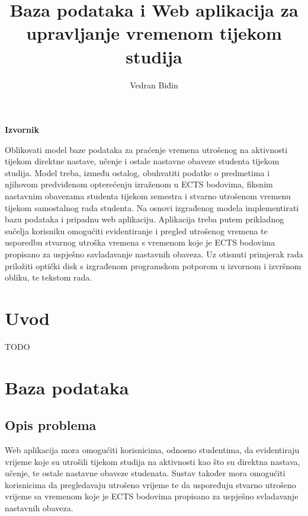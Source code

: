\documentclass[times, utf8, zavrsni]{fer}
\begin{document}

\title{Baza podataka i Web aplikacija za upravljanje vremenom tijekom studija}

\author{Vedran Biđin}

\maketitle

\textbf{Izvornik}\\\hspace*{\fill}

Oblikovati model baze podataka za praćenje vremena utrošenog na aktivnosti tijekom direktne nastave, učenje i ostale nastavne obaveze studenta tijekom studija. Model treba, između ostalog, obuhvatiti podatke o predmetima i njihovom predviđenom opterećenju izraženom u ECTS bodovima, fiksnim nastavnim obavezama studenta tijekom semestra i stvarno utrošenom vremenu tijekom samostalnog rada studenta. Na osnovi izgrađenog modela implementirati bazu podataka i pripadnu web aplikaciju. Aplikacija treba putem prikladnog sučelja korisniku omogućiti evidentiranje i pregled utrošenog vremena te usporedbu stvarnog utroška vremena s vremenom koje je ECTS bodovima propisano za uspješno savladavanje nastavnih obaveza. Uz otisnuti primjerak rada priložiti optički disk s izgrađenom programskom potporom u izvornom i izvršnom obliku, te tekstom rada.

\zahvala{}

\tableofcontents

\chapter{Uvod}
TODO

\chapter{Baza podataka}

\section{Opis problema}
Web aplikacija mora omogućiti korisnicima, odnosno studentima, da evidentiraju vrijeme koje su utrošili tijekom studija na aktivnosti kao što su direktna nastava, učenje, te ostale nastavne obaveze studenata. Sustav također mora omogućiti korisnicima da pregledavaju utrošeno vrijeme te da uspoređuju stvarno utrošeno vrijeme sa vremenom koje je ECTS bodovima propisano za uspješno svladavanje nastavnih obaveza.
\end{document}
